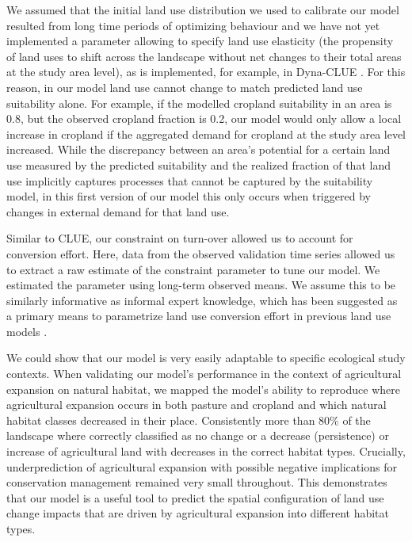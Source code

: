 \documentclass[titlesmallcaps,copyrightpage]{uomthesis}\usepackage[]{graphicx}\usepackage[]{color}
\begin{document}
We assumed that the initial land use distribution we used to calibrate
our model resulted from long time periods of optimizing behaviour and we
have not yet implemented a parameter allowing to specify land use
elasticity (the propensity of land uses to shift across the landscape
without net changes to their total areas at the study area level), as is
implemented, for example, in Dyna-CLUE \citep{verburg_combining_2009}.
For this reason, in our model land use cannot change to match predicted
land use suitability alone. For example, if the modelled cropland
suitability in an area is 0.8, but the observed cropland fraction is
0.2, our model would only allow a local increase in cropland if the
aggregated demand for cropland at the study area level increased. While
the discrepancy between an area's potential for a certain land use
measured by the predicted suitability and the realized fraction of that
land use implicitly captures processes that cannot be captured by the
suitability model, in this first version of our model this only occurs
when triggered by changes in external demand for that land use.

Similar to CLUE, our constraint on turn-over allowed us to account for
conversion effort. Here, data from the observed validation time series
allowed us to extract a raw estimate of the constraint parameter to tune
our model. We estimated the parameter using long-term observed means. We
assume this to be similarly informative as informal expert knowledge,
which has been suggested as a primary means to parametrize land use
conversion effort in previous land use models
\citep{van_asselen_land_2013, overmars_comparison_2007}.

We could show that our model is very easily adaptable to specific
ecological study contexts. When validating our model's performance in
the context of agricultural expansion on natural habitat, we mapped the
model's ability to reproduce where agricultural expansion occurs in both
pasture and cropland and which natural habitat classes decreased in
their place. Consistently more than 80\% of the landscape where
correctly classified as no change or a decrease (persistence) or
increase of agricultural land with decreases in the correct habitat
types. Crucially, underprediction of agricultural expansion with
possible negative implications for conservation management remained very
small throughout. This demonstrates that our model is a useful tool to
predict the spatial configuration of land use change impacts that are
driven by agricultural expansion into different habitat types.
\end{document}
